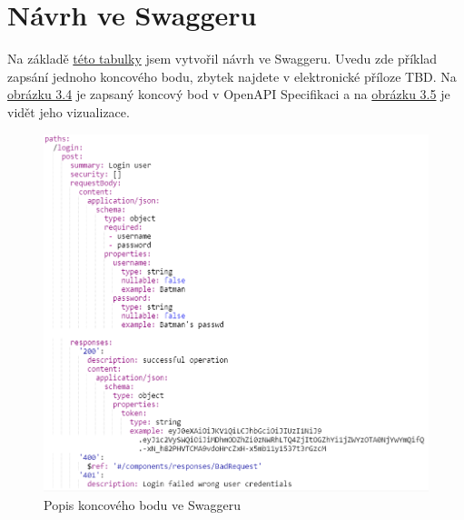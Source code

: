 \documentclass[thesis=B,czech]{FITthesis}[2012/06/26]
\begin{document}
    \section{Návrh ve Swaggeru}
        Na základě \hyperref[tab:tabulkaPokryti]{této tabulky} jsem vytvořil návrh ve Swaggeru. Uvedu zde příklad zapsání jednoho koncového bodu, zbytek najdete v elektronické příloze TBD. Na \hyperref[fig:SwaggerYAML]{obrázku 3.4} je zapsaný koncový bod v OpenAPI Specifikaci a na \hyperref[fig:SwaggerGenerated]{obrázku 3.5} je vidět jeho vizualizace.
        \begin{figure}[h!] \label{SwaggerYAML}
            \includegraphics[width=\linewidth]{Swagger_YAML_example}
            \caption{Popis koncového bodu ve Swaggeru}
        \end{figure}
\end{document}
